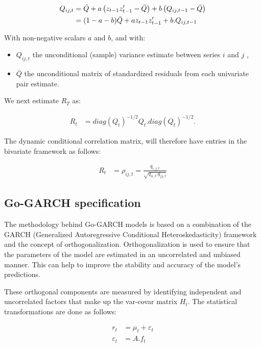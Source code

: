 \documentclass[11pt,preprint, authoryear]{elsarticle}
\numberwithin{equation}{section}
\numberwithin{figure}{section}
\numberwithin{table}{section}
\begin{document}
\begin{align}  \label{dcc2}
  Q_{ij,t} &= \bar Q + a\left(z_{t - 1}z'_{t - 1} - \bar{Q} \right) + b\left( Q_{ij, t - 1} - \bar{Q} \right) \hfill \\ \notag
        &= (1 - a - b)\bar{Q} + az_{t - 1}z'_{t - 1} + b.Q_{ij, t - 1} \notag
\end{align}

With non-negative scalars \(a\) and \(b\), and with:

\begin{itemize}
\item
  \(Q_{ij, t}\) the unconditional (sample) variance estimate between
  series \(i\) and \(j\) ,
\item
  \(\bar{Q}\) the unconditional matrix of standardized residuals from
  each univariate pair estimate.
\end{itemize}

We next estimate \(R_T\) as:

\begin{align}\label{eq:dcc3}
R_t &= diag(Q_t)^{-1/2}Q_t.diag(Q_t)^{-1/2}. 
\end{align}

The dynamic conditional correlation matrix, will therefore have entries
in the bivariate framework as follows:

\begin{align}
R_t &= \rho_{ij,t} = \frac{q_{i,j,t}}{\sqrt{q_{ii,t}.q_{jj,t}}} 
\end{align}

\hypertarget{go-garch-specification}{%
\subsection{Go-GARCH specification}\label{go-garch-specification}}

The methodology behind Go-GARCH models is based on a combination of the
GARCH (Generalized Autoregressive Conditional Heteroskedasticity)
framework and the concept of orthogonalization. Orthogonalization is
used to ensure that the parameters of the model are estimated in an
uncorrelated and unbiased manner. This can help to improve the stability
and accuracy of the model's predictions.

These orthogonal components are measured by identifying independent and
uncorrelated factors that make up the var-covar matrix \(H_t\). The
statistical transformations are done as follows:

\begin{align}
r_t &= \mu_t +\varepsilon_t  \\
\varepsilon_t &= A.f_t 
\end{align}
\end{document}
